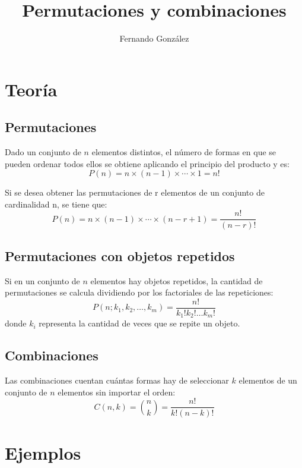 \documentclass{article}
\title{Permutaciones y combinaciones}
\author{Fernando González}
\date{}
\begin{document}
\maketitle

\section{Teoría}

\subsection{Permutaciones}
Dado un conjunto de $n$ elementos distintos, el número de formas en que se pueden ordenar todos ellos se obtiene aplicando el principio del producto y es:
\begin{equation}
    P(n) = n \times (n-1) \times \cdots \times 1 = n!
\end{equation}

Si se desea obtener las permutaciones de r elementos de un conjunto de cardinalidad n, se tiene que:
\begin{equation}
    P(n) = n \times (n-1) \times \cdots \times (n - r + 1) = \frac{n!}{(n - r)!}
\end{equation}

\subsection{Permutaciones con objetos repetidos}
Si en un conjunto de $n$ elementos hay objetos repetidos, la cantidad de permutaciones se calcula dividiendo por los factoriales de las repeticiones:
\begin{equation}
    P(n; k_1, k_2, \dots, k_m) = \frac{n!}{k_1! k_2! \dots k_m!}
\end{equation}
donde $k_i$ representa la cantidad de veces que se repite un objeto.

\subsection{Combinaciones}
Las combinaciones cuentan cuántas formas hay de seleccionar $k$ elementos de un conjunto de $n$ elementos sin importar el orden:
\begin{equation}
    C(n, k) = \binom{n}{k} = \frac{n!}{k!(n-k)!}
\end{equation}

\section{Ejemplos}
\end{document}
